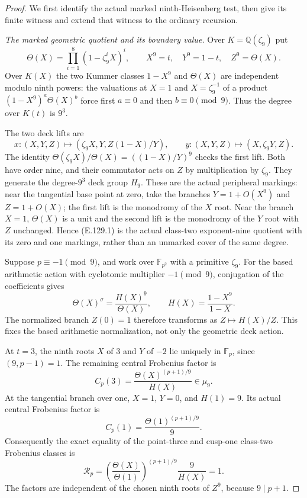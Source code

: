 \begin{proof}
We first identify the actual marked ninth-Heisenberg test,
then give its finite witness and extend that witness to
the ordinary recursion.

\emph{The marked geometric quotient and its boundary value.}
Over $K=\mathbb Q(\zeta_9)$ put
\[
 \Theta(X)=\prod_{i=1}^{8}(1-\zeta_9^iX)^i,
 \qquad
 X^9=t,\quad Y^9=1-t,\quad Z^9=\Theta(X).
 \tag{E.129.1}
\]
Over $K(X)$ the two Kummer classes $1-X^9$ and
$\Theta(X)$ are independent modulo ninth powers:
the valuations at $X=1$ and $X=\zeta_9^{-1}$ of a
product $(1-X^9)^a\Theta(X)^b$ force first
$a\equiv0$ and then $b\equiv0\pmod9$.
Thus the degree over $K(t)$ is $9^3$.

The two deck lifts are
\[
 x:(X,Y,Z)\longmapsto
     (\zeta_9X,Y,Z(1-X)/Y),
 \qquad
 y:(X,Y,Z)\longmapsto(X,\zeta_9Y,Z).
 \tag{E.129.2}
\]
The identity
$\Theta(\zeta_9X)/\Theta(X)=((1-X)/Y)^9$
checks the first lift. Both have order nine, and their
commutator acts on $Z$ by multiplication by $\zeta_9$.
They generate the degree-$9^3$ deck group $H_9$.
These are the actual peripheral markings: near the
tangential base point at zero, take the branches
$Y=1+O(X^9)$ and $Z=1+O(X)$; the first lift is the
monodromy of the $X$ root. Near the branch $X=1$,
$\Theta(X)$ is a unit and the second lift is the
monodromy of the $Y$ root with $Z$ unchanged. Hence
(E.129.1) is the actual class-two exponent-nine
quotient with its zero and one markings, rather than
an unmarked cover of the same degree.

Suppose $p\equiv-1\pmod9$, and work over
$\mathbb F_{p^2}$ with a primitive $\zeta_9$.
For the based arithmetic action with cyclotomic
multiplier $-1\pmod9$, conjugation of the coefficients
gives
\[
 \Theta(X)^{\sigma}=
       \frac{H(X)^9}{\Theta(X)},
 \qquad H(X)=\frac{1-X^9}{1-X}.
\]
The normalized branch $Z(0)=1$ therefore transforms
as $Z\mapsto H(X)/Z$. This fixes the based arithmetic
normalization, not only the geometric deck action.

At $t=3$, the ninth roots $X$ of $3$ and $Y$ of
$-2$ lie uniquely in $\mathbb F_p$, since
$(9,p-1)=1$. The remaining central Frobenius factor
is
\[
 C_p(3)=\frac{\Theta(X)^{(p+1)/9}}{H(X)}\in\mu_9.
\]
At the tangential branch over one, $X=1$, $Y=0$,
and $H(1)=9$. Its actual central Frobenius factor is
\[
 C_p(1)=\frac{\Theta(1)^{(p+1)/9}}9.
\]
Consequently the exact equality of the point-three
and cusp-one class-two Frobenius classes is
\[
 \mathcal R_p=
    \left(\frac{\Theta(X)}{\Theta(1)}\right)^{(p+1)/9}
          \frac9{H(X)}=1.
 \tag{E.129.3}
\]
The factors are independent of the chosen ninth roots
of $Z^9$, because $9\mid p+1$.


\end{proof}
